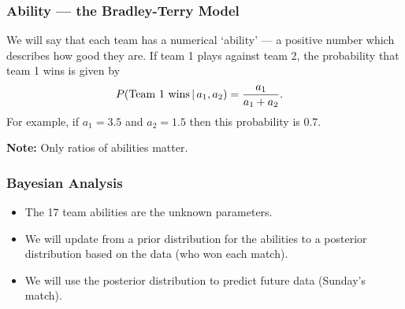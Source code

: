 \documentclass{beamer}
\newcommand{\given}{\,|\,}
\begin{document}
\begin{frame}[fragile]
\frametitle{Ability --- the Bradley-Terry Model}
We will say that each team has a numerical `ability' --- a positive number which
describes how good they are. If team 1 plays against team 2, the probability
that team 1 wins is given by
\begin{align}
P(\textnormal{Team 1 wins} \given a_1, a_2)
    &= \frac{a_1}{a_1 + a_2}.
\end{align}
For example, if $a_1 = 3.5$ and $a_2 = 1.5$ then this probability is 0.7.\pause

{\bf Note:} Only ratios of abilities matter.

\end{frame}

\begin{frame}[fragile]
\frametitle{Bayesian Analysis}
\begin{itemize}
\item The 17 team abilities are the unknown parameters. \pause
\item We will update from a prior distribution for the abilities to a posterior
distribution based on the data (who won each match).\pause
\item We will use the posterior distribution to predict future data (Sunday's
match).
\end{itemize}

\end{frame}
\end{document}
